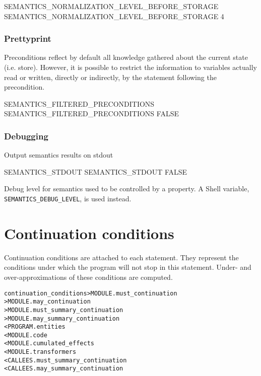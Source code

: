 \documentclass[a4paper]{report}
\newenvironment{PipsMake}{\begin{alltt}}{\end{alltt}}
\begin{document}
\begin{PipsProp}{SEMANTICS_NORMALIZATION_LEVEL_BEFORE_STORAGE}
SEMANTICS_NORMALIZATION_LEVEL_BEFORE_STORAGE 4
\end{PipsProp}

\subsubsection{Prettyprint}

Preconditions reflect by default all knowledge gathered about the current
state (i.e. store). However, it is possible to restrict the information to
variables actually read or written, directly or indirectly, by the
statement following the precondition.

\begin{PipsProp}{SEMANTICS_FILTERED_PRECONDITIONS}
SEMANTICS_FILTERED_PRECONDITIONS FALSE
\end{PipsProp}


\subsubsection{Debugging}

Output semantics results on stdout

\begin{PipsProp}{SEMANTICS_STDOUT}
SEMANTICS_STDOUT FALSE
\end{PipsProp}

Debug level for semantics used to be controlled by a property. A Shell
variable, \verb/SEMANTICS_DEBUG_LEVEL/, is used instead.



\section{Continuation conditions}
\label{subsection-continuation-conditions}

Continuation conditions are attached to each statement. They represent the
conditions under which the program will not stop in this statement. Under-
and over-approximations of these conditions are computed.

\begin{PipsMake}
continuation_conditions > MODULE.must_continuation
                        > MODULE.may_continuation
                        > MODULE.must_summary_continuation
                        > MODULE.may_summary_continuation
        < PROGRAM.entities
        < MODULE.code
        < MODULE.cumulated_effects
        < MODULE.transformers
        < CALLEES.must_summary_continuation
        < CALLEES.may_summary_continuation
\end{PipsMake}
\end{document}
